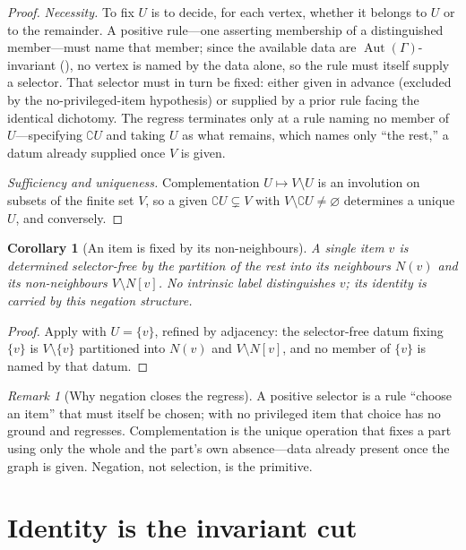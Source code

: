 \documentclass[11pt,twocolumn,a4paper]{article}
\theoremstyle{dirthm}
\newtheorem{corollary}[theorem]{Corollary}
\theoremstyle{definition}
\theoremstyle{remark}
\newtheorem{remark}[theorem]{Remark}
\newcommand{\Gph}{\Gamma}
\newcommand{\V}{V}
\newcommand{\co}{\complement}
\newcommand{\set}[1]{\{#1\}}
\DeclareMathOperator{\Aut}{Aut}
\begin{document}
\begin{proof}
\emph{Necessity.} To fix $U$ is to decide, for each vertex, whether it
belongs to $U$ or to the remainder. A positive rule---one asserting
membership of a distinguished member---must name that member; since the
available data are $\Aut(\Gph)$-invariant (), no vertex is
named by the data alone, so the rule must itself supply a selector. That
selector must in turn be fixed: either given in advance (excluded by the
no-privileged-item hypothesis) or supplied by a prior rule facing the
identical dichotomy. The regress terminates only at a rule naming no member
of $U$---specifying $\co U$ and taking $U$ as what remains, which names only
``the rest,'' a datum already supplied once $\V$ is given.

\emph{Sufficiency and uniqueness.} Complementation $U\mapsto\V\setminus U$ is
an involution on subsets of the finite set $\V$, so a given $\co U\subsetneq\V$
with $\V\setminus\co U\neq\varnothing$ determines a unique $U$, and
conversely.
\end{proof}

\begin{corollary}[An item is fixed by its non-neighbours]
\label{cor:nonneighbours}
A single item $v$ is determined selector-free by the partition of the rest
into its neighbours $N(v)$ and its non-neighbours $\V\setminus N[v]$. No
intrinsic label distinguishes $v$; its identity is carried by this negation
structure.
\end{corollary}

\begin{proof}
Apply  with $U=\set{v}$, refined by adjacency: the
selector-free datum fixing $\set{v}$ is $\V\setminus\set{v}$ partitioned into
$N(v)$ and $\V\setminus N[v]$, and no member of $\set{v}$ is named by that
datum.
\end{proof}

\begin{remark}[Why negation closes the regress]
\label{rem:regress}
A positive selector is a rule ``choose an item'' that must itself be chosen;
with no privileged item that choice has no ground and regresses.
Complementation is the unique operation that fixes a part using only the
whole and the part's own absence---data already present once the graph is
given. Negation, not selection, is the primitive.
\end{remark}

\section{Identity is the invariant cut}
\label{sec:identity}
\end{document}
